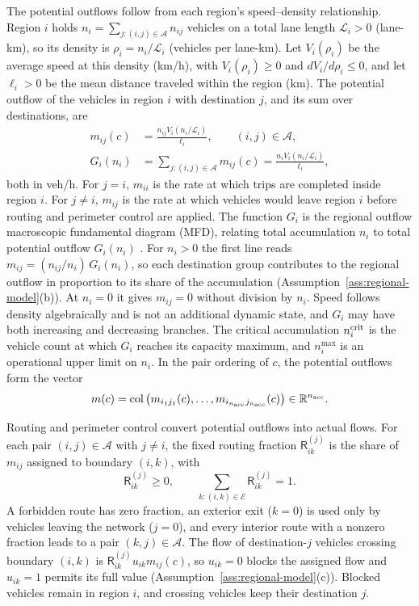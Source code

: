 \documentclass[final]{cas-sc}
\theoremstyle{definition}
\theoremstyle{plain}
\theoremstyle{definition}
\theoremstyle{plain}
\newcommand{\R}{\mathbb{R}}
\begin{document}
The potential outflows follow from each region's speed--density
relationship. Region $i$ holds
$n_i=\sum_{j:(i,j)\in\mathcal A}n_{ij}$ vehicles on a total lane length
$\mathcal L_i>0$ (lane-km), so its density is
$\rho_i=n_i/\mathcal L_i$ (vehicles per lane-km). Let $V_i(\rho_i)$ be
the average speed at this density (km/h), with $V_i(\rho_i)\ge0$ and
$dV_i/d\rho_i\le0$, and let $\ell_i>0$ be the mean distance traveled
within the region (km). The potential outflow of the vehicles in region
$i$ with destination $j$, and its sum over destinations, are
\begin{equation}
\begin{aligned}
m_{ij}(c)&=\frac{n_{ij}V_i(n_i/\mathcal L_i)}{\ell_i},
\qquad (i,j)\in\mathcal A,\\
G_i(n_i)&=\sum_{j:(i,j)\in\mathcal A}m_{ij}(c)
=\frac{n_iV_i(n_i/\mathcal L_i)}{\ell_i},
\end{aligned}
\label{eq:class-potential-flow}
\end{equation}
both in veh/h. For $j=i$, $m_{ii}$ is the rate at which trips are
completed inside region $i$. For $j\ne i$, $m_{ij}$ is the rate at
which vehicles would leave region $i$ before routing and perimeter
control are applied. The function $G_i$ is the regional outflow
macroscopic fundamental diagram (MFD), relating total accumulation
$n_i$ to total potential outflow $G_i(n_i)$
\cite{geroliminis2008existence,mariotte2017comparisons}. For $n_i>0$
the first line reads $m_{ij}=(n_{ij}/n_i)\,G_i(n_i)$, so each
destination group contributes to the regional outflow in proportion to
its share of the accumulation
(Assumption~\ref{ass:regional-model}(b)). At $n_i=0$ it gives
$m_{ij}=0$ without division by $n_i$. Speed follows density
algebraically and is not an additional dynamic state, and $G_i$ may
have both increasing and decreasing branches. The critical
accumulation $n_i^{\rm crit}$ is the vehicle count at which $G_i$
reaches its capacity maximum, and $n_i^{\max}$ is an operational upper
limit on $n_i$. In the pair ordering of $c$, the potential outflows
form the vector
\[
m(c)=\operatorname{col}\big(m_{i_1j_1}(c),\ldots,
m_{i_{n_{\rm acc}}j_{n_{\rm acc}}}(c)\big)\in\R^{n_{\rm acc}}.
\]

Routing and perimeter control convert potential outflows into actual
flows. For each pair $(i,j)\in\mathcal A$ with $j\ne i$, the fixed
routing fraction $\mathsf R_{ik}^{(j)}$ is the share of $m_{ij}$
assigned to boundary $(i,k)$, with
\[
\mathsf R_{ik}^{(j)}\ge0,\qquad
\sum_{k:(i,k)\in\mathcal E}\mathsf R_{ik}^{(j)}=1.
\]
A forbidden route has zero fraction, an exterior exit ($k=0$) is used
only by vehicles leaving the network ($j=0$), and every interior route
with a nonzero fraction leads to a pair $(k,j)\in\mathcal A$. The flow
of destination-$j$ vehicles crossing boundary $(i,k)$ is
$\mathsf R_{ik}^{(j)}u_{ik}m_{ij}(c)$, so $u_{ik}=0$ blocks the assigned
flow and $u_{ik}=1$ permits its full value
(Assumption~\ref{ass:regional-model}(c)). Blocked vehicles remain in
region $i$, and crossing vehicles keep their destination $j$.
\end{document}
